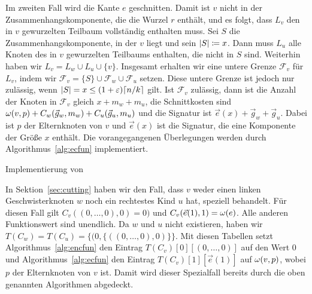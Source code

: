 Im zweiten Fall wird die Kante $e$ geschnitten.
 Damit ist $v$ nicht in der Zusammenhangskomponente, die die Wurzel $r$ enthält, und es folgt, dass $L_v$ den in $v$ gewurzelten Teilbaum vollständig enthalten muss. 
Sei $S$ die Zusammenhangskomponente, in der $v$ liegt und sein $\lvert S\rvert \coloneqq x$.
Dann muss $L_u$ alle Knoten des in $v$ gewurzelten Teilbaums enthalten, die nicht in $S$ sind.
Weiterhin haben wir $L_v = L_w \cup L_u \cup \{v\}$. 
Insgesamt erhalten wir eine untere Grenze $\mathcal{F}_v$ für $L_v$, indem wir $\mathcal{F}_v = \{S\} \cup \mathcal{F}_w \cup \mathcal{F}_u$ setzen.
Diese untere Grenze ist jedoch nur zulässig, wenn $\lvert S\rvert = x \leq (1+\varepsilon)\lceil n/k\rceil$ gilt.
Ist $\mathcal{F}_v$ zulässig, dann ist die Anzahl der Knoten in $\mathcal{F}_v$ gleich $x + m_w + m_u$, die Schnittkosten sind $\omega(v,p) + C_w(\vec{g}_w, m_w) + C_u(\vec{g}_u, m_u)$ und die Signatur ist $\vec{e}(x) + \vec{g}_w + \vec{g}_u$.
Dabei ist $p$ der Elternknoten von $v$ und $\vec{e}(x)$ ist die Signatur, die eine Komponente der Größe $x$ enthält.
Die vorangegangenen Überlegungen werden durch Algorithmus~\ref{alg:ecfun} implementiert.


\begin{algorithm}
    \caption{Implementierung von }\label{alg:ecfun}
    \begin{algorithmic}[1]
             
                \Return
            \Else
                 
            \EndIf
        \EndFunction
    \end{algorithmic}
\end{algorithm}

\begin{rem}
    In Sektion~\ref{sec:cutting} haben wir den Fall, dass $v$ weder einen linken Geschwisterknoten $w$ noch ein rechtestes Kind $u$ hat, speziell behandelt.
    Für diesen Fall gilt $C_v((0,\ldots,0), 0) = 0)$ und $C_v(\vec{e}(1), 1) = \omega(e)$. 
    Alle anderen Funktionswert sind unendlich.
    Da $w$ und $u$ nicht existieren, haben wir $T(C_w) = T(C_u) = \{(0, \{((0, \ldots, 0), 0)\} \}$.
    Mit diesen Tabellen setzt Algorithmus~\ref{alg:encfun} den Eintrag $T(C_v)[0][(0,\ldots, 0)]$ auf den Wert $0$ und Algorithmus~\ref{alg:ecfun} den Eintrag $T(C_v)[1][\vec{e}(1)]$ auf $\omega(v,p)$, wobei $p$ der Elternknoten von $v$ ist.
    Damit wird dieser Spezialfall bereits durch die oben genannten Algorithmen abgedeckt.
\end{rem}

